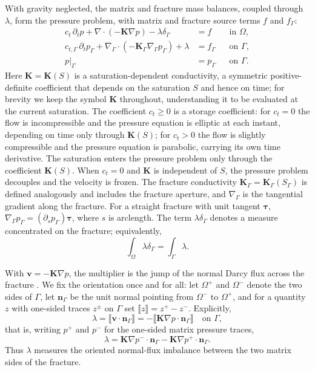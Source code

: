 \documentclass[a4paper,fleqn]{cas-sc}
\newcommand{\jump}[1]{\lBrack #1 \rBrack}
\newcommand{\Kmat}{\mathbf{K}}
\newcommand{\vflux}{\mathbf{v}}
\begin{document}
With gravity neglected, the matrix and fracture mass balances, coupled through
\(\lambda\), form the pressure problem, with matrix and fracture
source terms \(f\) and \(f_\Gamma\):
\begin{equation}
\begin{aligned}
c_t\,\partial_t p + \nabla\cdot\left(-\Kmat\nabla p\right) - \lambda \delta_\Gamma &= f
&& \text{in } \Omega,\\
c_{t,\Gamma}\,\partial_t p_\Gamma + \nabla_\Gamma\cdot\left(-\Kmat_\Gamma\nabla_\Gamma p_\Gamma\right) + \lambda &= f_\Gamma
&& \text{on } \Gamma,\\
p|_\Gamma &= p_\Gamma
&& \text{on } \Gamma.
\end{aligned}
\label{eq:lmdfm_strong}
\end{equation}
Here \(\Kmat=\Kmat(S)\) is a saturation-dependent conductivity, a symmetric
positive-definite coefficient that depends on the saturation \(S\) and hence on
time; for brevity we keep the symbol \(\Kmat\) throughout, understanding it to be
evaluated at the current saturation. The coefficient \(c_t\ge 0\) is a storage
coefficient: for \(c_t=0\) the flow is incompressible and the pressure equation is
elliptic at each instant, depending on time only through \(\Kmat(S)\); for \(c_t>0\) the flow is slightly compressible and the pressure
equation is parabolic, carrying its own time derivative. The
saturation enters the pressure problem only through the coefficient \(\Kmat(S)\). When \(c_t=0\) and \(\Kmat\) is
independent of \(S\), the pressure problem decouples and the velocity is frozen.
The fracture conductivity \(\Kmat_\Gamma=\Kmat_\Gamma(S_\Gamma)\) is defined
analogously and includes the fracture aperture, and \(\nabla_\Gamma\) is the
tangential gradient along the fracture. For a straight fracture with unit tangent
\(\bm{\tau}\), \(\nabla_\Gamma p_\Gamma=(\partial_s p_\Gamma)\bm{\tau}\), where
\(s\) is arclength. The term \(\lambda\delta_\Gamma\) denotes a measure
concentrated on the fracture; equivalently,
\[
  \int_\Omega \lambda\delta_\Gamma = \int_\Gamma \lambda .
\]

With \(\vflux=-\Kmat\nabla p\), the multiplier is the jump of the normal Darcy
flux across the fracture \citep{Koeppel2019}. We fix the orientation once and for all: let
\(\Omega^+\) and \(\Omega^-\) denote the two sides of \(\Gamma\), let
\(\mathbf{n}_\Gamma\) be the unit normal pointing from \(\Omega^-\) to
\(\Omega^+\), and for a quantity \(z\) with one-sided traces \(z^\pm\) on
\(\Gamma\) set \(\jump{z}=z^+-z^-\). Explicitly,
\[
  \lambda=\jump{\vflux\cdot\mathbf{n}_\Gamma}
  =-\jump{\Kmat\nabla p\cdot\mathbf{n}_\Gamma}
  \quad \text{on } \Gamma,
\]
that is, writing \(p^+\) and \(p^-\) for the one-sided matrix pressure traces,
\[
  \lambda
  =
  \Kmat\nabla p^-\cdot\mathbf{n}_\Gamma
  -
  \Kmat\nabla p^+\cdot\mathbf{n}_\Gamma .
\]
Thus \(\lambda\) measures the oriented normal-flux imbalance between the two
matrix sides of the fracture.
\end{document}

